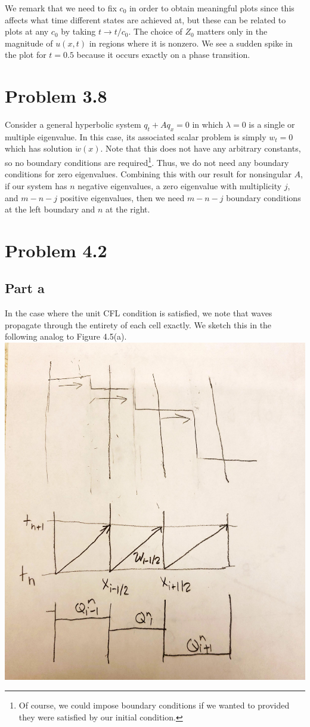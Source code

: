 \documentclass{article}
\begin{document}
We remark that we need to fix $c_0$ in order to obtain meaningful plots since this affects what time different states are achieved at, but these can be related to plots at any $c_0$ by taking $t\to t/c_0$. The choice of $Z_0$ matters only in the magnitude of $u(x,t)$ in regions where it is nonzero. We see a sudden spike in the plot for $t=0.5$ because it occurs exactly on a phase transition.

\section{Problem 3.8}
Consider a general hyperbolic system $q_t+Aq_x=0$ in which $\lambda=0$ is a single or multiple eigenvalue. In this case, its associated scalar problem is simply $w_t=0$ which has solution $\mathring{w}(x)$. Note that this does not have any arbitrary constants, so no boundary conditions are required\footnote{Of course, we could impose boundary conditions if we wanted to provided they were satisfied by our initial condition.}. Thus, we do not need any boundary conditions for zero eigenvalues. Combining this with our result for nonsingular $A$, if our system has $n$ negative eigenvalues, a zero eigenvalue with multiplicity $j$, and $m-n-j$ positive eigenvalues, then we need $m-n-j$ boundary conditions at the left boundary and $n$ at the right.

\section{Problem 4.2}
\subsection{Part a}
In the case where the unit CFL condition is satisfied, we note that waves propagate through the entirety of each cell exactly. We sketch this in the following analog to Figure 4.5(a).\\
\includegraphics[scale=0.5]{574end_me.pdf}
\end{document}
